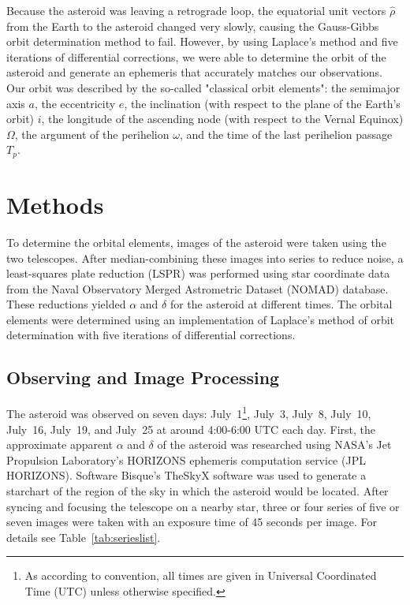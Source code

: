 \documentclass[12pt,journal,compsoc]{IEEEtran}
\begin{document}
Because the asteroid was leaving a retrograde loop, the equatorial unit vectors $\hat{\rho}$ from the Earth to the asteroid changed very slowly, causing the Gauss-Gibbs orbit determination method to fail.
However, by using Laplace's method and five iterations of differential corrections, we were able to determine the orbit of the asteroid and generate an ephemeris that accurately matches our observations.
Our orbit was described by the so-called "classical orbit elements": the semimajor axis $a$, the eccentricity $e$, the inclination (with respect to the plane of the Earth's orbit) $i$, the longitude of the ascending node (with respect to the Vernal Equinox) $\Omega$, the argument of the perihelion $\omega$, and the time of the last perihelion passage $T_p$.

\section{Methods}
To determine the orbital elements, images of the asteroid were taken using the two telescopes.
After median-combining these images into series to reduce noise, a least-squares plate reduction (LSPR) was performed using star coordinate data from the Naval Observatory Merged Astrometric Dataset (NOMAD) database. These reductions yielded $\alpha$ and $\delta$ for the asteroid at different times.
The orbital elements were determined using an implementation of Laplace's method of orbit determination with five iterations of differential corrections.

\subsection{Observing and Image Processing}
The asteroid was observed on seven days: July~1\footnote{As according to convention, all times are given in Universal Coordinated Time (UTC) unless otherwise specified.}, July~3, July~8, July~10, July~16, July~19, and July~25 at around 4:00-6:00 UTC each day.
First, the approximate apparent $\alpha$ and $\delta$ of the asteroid was researched using NASA's Jet Propulsion Laboratory's HORIZONS ephemeris computation service (JPL HORIZONS).
Software Bisque's TheSkyX software was used to generate a starchart of the region of the sky in which the asteroid would be located.
After syncing and focusing the telescope on a nearby star, three or four series of five or seven images were taken with an exposure time of 45 seconds per image. For details see Table~\ref{tab:serieslist}. 
\end{document}
